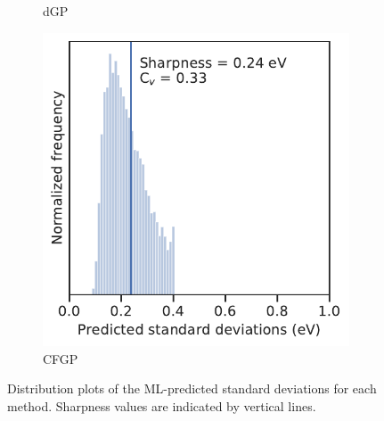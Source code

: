 \documentclass[]{achemso}
\begin{document}
\begin{figure}
\begin{subfigure}{0.32\textwidth}
        \caption{\gls{dGP}}\label{fig:sharpness_dgp}
    \end{subfigure}
    \begin{subfigure}{0.32\textwidth}
        \includegraphics[width=\textwidth]{../CFGP/Matern/sharpness.pdf}
        \caption{\gls{CFGP}}\label{fig:sharpness_cfgp}
    \end{subfigure}
    \caption{Distribution plots of the \gls{ML}-predicted standard deviations for each method.
    Sharpness values are indicated by vertical lines.}\label{fig:sharpness}
\end{figure}
\end{document}
